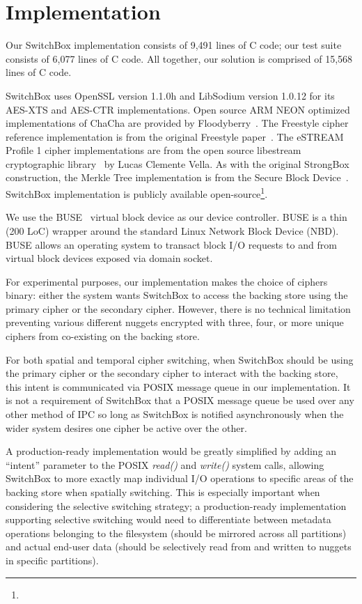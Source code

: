\section{Implementation}

Our SwitchBox implementation consists of 9,491 lines of C code; our test suite
consists of 6,077 lines of C code. All together, our solution is comprised of
15,568 lines of C code.

SwitchBox uses OpenSSL version 1.1.0h and LibSodium version 1.0.12 for its
AES-XTS and AES-CTR implementations. Open source ARM NEON optimized
implementations of ChaCha are provided by Floodyberry~\cite{Floodyberry}. The
Freestyle cipher reference implementation is from the original Freestyle
paper~\cite{Freestyle}. The eSTREAM Profile 1 cipher implementations are from
the open source libestream cryptographic library~\cite{libestream} by Lucas
Clemente Vella. As with the original StrongBox construction, the Merkle Tree
implementation is from the Secure Block Device~\cite{SBD}. SwitchBox
implementation is publicly available open-source\footnote{\SystemURI}.

We use the BUSE~\cite{BUSE} virtual block device as our device controller.
BUSE is a thin (200 LoC) wrapper around the standard Linux Network Block Device
(NBD). BUSE allows an operating system to transact block I/O requests to and
from virtual block devices exposed via domain socket.

For experimental purposes, our implementation makes the choice of ciphers
binary: either the system wants SwitchBox to access the backing store using the
primary cipher or the secondary cipher. However, there is no technical
limitation preventing various different nuggets encrypted with three, four, or
more unique ciphers from co-existing on the backing store.

For both spatial and temporal cipher switching, when SwitchBox should be using
the primary cipher or the secondary cipher to interact with the backing store,
this intent is communicated via POSIX message queue in our implementation. It is
not a requirement of SwitchBox that a POSIX message queue be used over any other
method of IPC so long as SwitchBox is notified asynchronously when the wider
system desires one cipher be active over the other.

A production-ready implementation would be greatly simplified by adding an
``intent'' parameter to the POSIX \textit{read()} and \textit{write()} system
calls, allowing SwitchBox to more exactly map individual I/O operations to
specific areas of the backing store when spatially switching. This is especially
important when considering the selective switching strategy; a production-ready
implementation supporting selective switching would need to differentiate
between metadata operations belonging to the filesystem (should be mirrored
across all partitions) and actual end-user data (should be selectively read from
and written to nuggets in specific partitions).

